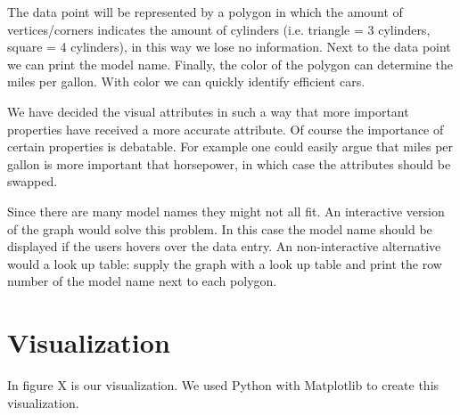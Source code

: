 \documentclass{article}[10pt]
\begin{document}
The data point will be represented by a polygon in which the amount of
vertices/corners indicates the amount of cylinders (i.e. triangle = 3 cylinders,
square = 4 cylinders), in this way we lose no information.
Next to the data point we can print the model name.
Finally, the color of the polygon can determine the miles per gallon. With
color we can quickly identify efficient cars.

We have decided the visual attributes in such a way that more important
properties have received a more accurate attribute. Of course the importance of
certain properties is debatable. For example one could easily argue that
miles per gallon is more important that horsepower, in which case the attributes
should be swapped.

Since there are many model names they might not all fit. An interactive version
of the graph would solve this problem. In this case the model name should be
displayed if the users hovers over the data entry. An non-interactive
alternative would a look up table: supply the graph with a look up table and
print the row number of the model name next to each polygon.

\section{Visualization}
In figure X is our visualization. We used Python with Matplotlib to create this
visualization.
\end{document}
